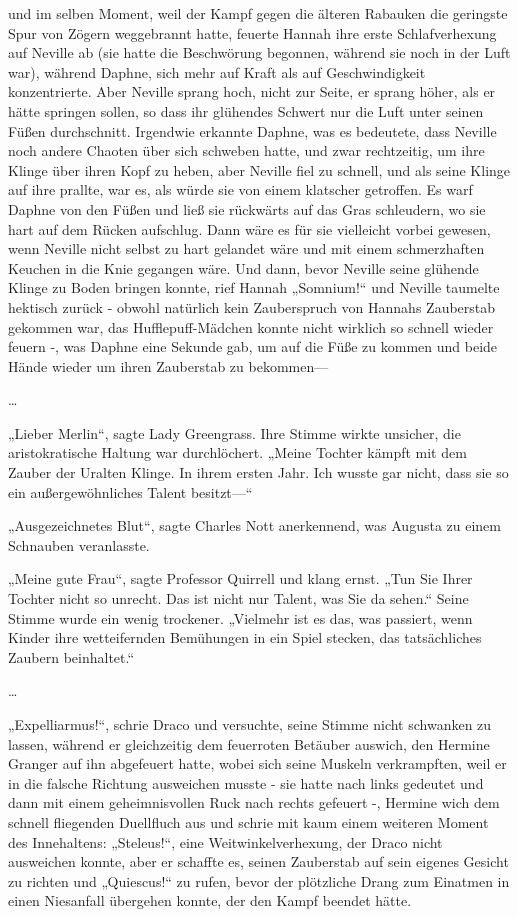 {und im selben Moment, weil der Kampf gegen die älteren Rabauken die geringste Spur von Zögern weggebrannt hatte, feuerte Hannah ihre erste Schlafverhexung auf Neville ab (sie hatte die Beschwörung begonnen, während sie noch in der Luft war), während Daphne, sich mehr auf Kraft als auf Geschwindigkeit konzentrierte. Aber Neville sprang hoch, nicht zur Seite, er sprang höher, als er hätte springen sollen, so dass ihr glühendes Schwert nur die Luft unter seinen Füßen durchschnitt. Irgendwie erkannte Daphne, was es bedeutete, dass Neville noch andere Chaoten über sich schweben hatte, und zwar rechtzeitig, um ihre Klinge über ihren Kopf zu heben, aber Neville fiel zu schnell, und als seine Klinge auf ihre prallte, war es, als würde sie von einem klatscher getroffen. Es warf Daphne von den Füßen und ließ sie rückwärts auf das Gras schleudern, wo sie hart auf dem Rücken aufschlug. Dann wäre es für sie vielleicht vorbei gewesen, wenn Neville nicht selbst zu hart gelandet wäre und mit einem schmerzhaften Keuchen in die Knie gegangen wäre. Und dann, bevor Neville seine glühende Klinge zu Boden bringen konnte, rief Hannah „Somnium!“ und Neville taumelte hektisch zurück - obwohl natürlich kein Zauberspruch von Hannahs Zauberstab gekommen war, das Hufflepuff-Mädchen konnte nicht wirklich so schnell wieder feuern -, was Daphne eine Sekunde gab, um auf die Füße zu kommen und beide Hände wieder um ihren Zauberstab zu bekommen—

…

„Lieber Merlin“, sagte Lady Greengrass. Ihre Stimme wirkte unsicher, die aristokratische Haltung war durchlöchert. „Meine Tochter kämpft mit dem Zauber der Uralten Klinge. In ihrem ersten Jahr. Ich wusste gar nicht, dass sie so ein außergewöhnliches Talent besitzt—“

„Ausgezeichnetes Blut“, sagte Charles Nott anerkennend, was Augusta zu einem Schnauben veranlasste.

„Meine gute Frau“, sagte Professor Quirrell und klang ernst. „Tun Sie Ihrer Tochter nicht so unrecht. Das ist nicht nur Talent, was Sie da sehen.“ Seine Stimme wurde ein wenig trockener. „Vielmehr ist es das, was passiert, wenn Kinder ihre wetteifernden Bemühungen in ein Spiel stecken, das tatsächliches Zaubern beinhaltet.“

…

„Expelliarmus!“, schrie Draco und versuchte, seine Stimme nicht schwanken zu lassen, während er gleichzeitig dem feuerroten Betäuber auswich, den Hermine Granger auf ihn abgefeuert hatte, wobei sich seine Muskeln verkrampften, weil er in die falsche Richtung ausweichen musste - sie hatte nach links gedeutet und dann mit einem geheimnisvollen Ruck nach rechts gefeuert -, Hermine wich dem schnell fliegenden Duellfluch aus und schrie mit kaum einem weiteren Moment des Innehaltens: „Steleus!“, eine Weitwinkelverhexung, der Draco nicht ausweichen konnte, aber er schaffte es, seinen Zauberstab auf sein eigenes Gesicht zu richten und „Quiescus!“ zu rufen, bevor der plötzliche Drang zum Einatmen in einen Niesanfall übergehen konnte, der den Kampf beendet hätte.

}
